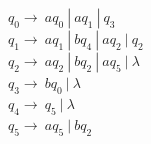 \documentclass[10pt]{article}
\begin{document}
{\begin{enumerate}
		\\\\
		$q_0\rightarrow\ aq_0\ |\ aq_1\ |\ q_3$\\
		$q_1\rightarrow\ aq_1\ |\ bq_4\ |\ aq_2\ |\ q_2$\\
		$q_2\rightarrow\ aq_2\ |\ bq_2\ |\ aq_5\ | \ \lambda$\\
		$q_3\rightarrow\ bq_0\ |\ \lambda$\\
		$q_4\rightarrow\ q_5\ |\ \lambda$\\
		$q_5\rightarrow\ aq_5\ |\ bq_2$
		
	\end{enumerate}	
}
\end{document}
